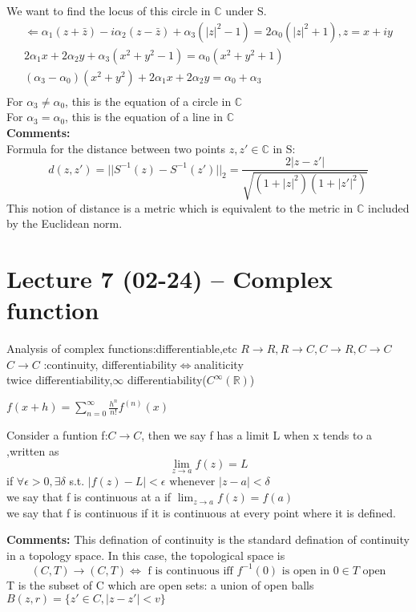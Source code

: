 We want to find the locus of this circle in $ \mathbb{C} $ under S.
\begin{align*}{}{}
\Leftarrow \alpha_1(z+\bar{z})-i\alpha_2(z-\bar{z})+\alpha_3(|z|^2-1)=2\alpha_0(|z|^2+1), z=x+iy\\
2\alpha_1x+2\alpha_2y+\alpha_3(x^2+y^2-1)=\alpha_0(x^2+y^2+1)\\
(\alpha_3-\alpha_0)(x^2+y^2)+2\alpha_1x+2\alpha_2y=\alpha_0+\alpha_3\\
\end{align*}
For $ \alpha_3\neq\alpha_0 $, this is the equation of a circle in $ \mathbb{C} $
\\For $ \alpha_3=\alpha_0 $, this is the equation of a line in $ \mathbb{C} $
\\\textbf{Comments:}    
\\Formula for the distance between two points $ z,z'\in\mathbb{C}$ in S:$$
    d(z,z')=||S^{-1}(z)-S^{-1}(z')||_2=\frac{2|z-z'|}{\sqrt{(1+|z|^2)(1+|z'|^2)}}
$$  
This notion of distance is a metric which is equivalent to the metric in $ \mathbb{C} $ included by the Euclidean norm.
\section{Lecture 7 (02-24) -- {Complex function}}
Analysis of complex functions:differentiable,etc
$ R\rightarrow R,R\rightarrow C, C\rightarrow R, C\rightarrow C $ 
\\$  C\rightarrow C $ :continuity, differentiability$ \Leftrightarrow $analiticity
\\twice differentiability,$ \infty $ differentiability($ C^{\infty}(\mathbb{R}) $)
\begin{definition}[analiticity]{}
$f(x+h)=\sum_{n=0}^{\infty}\frac{h^n}{n!}f^{(n)}(x)$
\end{definition} 
\begin{definition}[continuity]{}
Consider a funtion f:$ C\rightarrow C $, then we say f has a limit L when x tends to a ,written as$$
    \lim_{z\rightarrow a}f(z)=L
$$  
if $ \forall \epsilon>0,\exists \delta $ s.t. $ |f(z)-L|<\epsilon\text{ whenever } |z-a|<\delta  $
\\we say that f is continuous at a if $ \lim_{z\rightarrow a}f(z)=f(a) $
\\we say that f is continuous if it is continuous at every point where it is defined.
\end{definition} 
\textbf{Comments:}
This defination of continuity is the standard defination of continuity in a topology space. In this case, the topological space is$$
    (C,T)\rightarrow (C,T) \Leftrightarrow \text{ f is continuous iff } f^{-1}(0)\text{ is open in } 0\in T \text{ open}
$$ T is the subset of C which are open sets: a union of open balls $ B(z,r)=\{z'\in C,|z-z'|<v\} $ 
